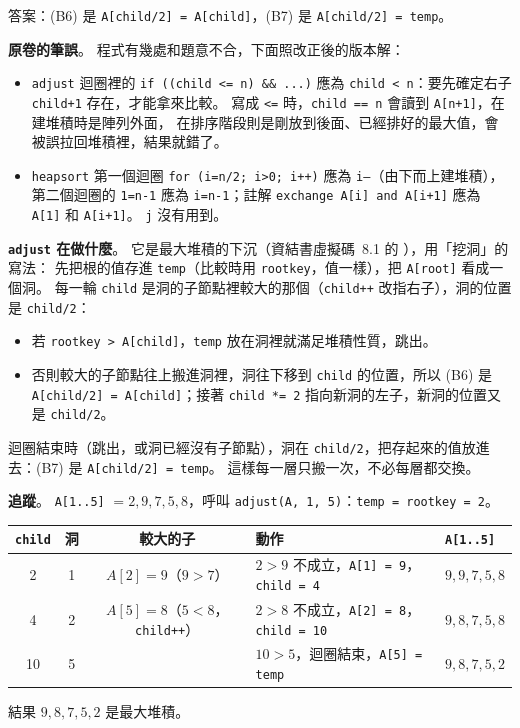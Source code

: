 \begin{pastsoln}
答案：(B6) 是 \texttt{A[child/2] = A[child]}，(B7) 是 \texttt{A[child/2] = temp}。

\textbf{原卷的筆誤}。 程式有幾處和題意不合，下面照改正後的版本解：
\begin{itemize}
\item \texttt{adjust} 迴圈裡的 \texttt{if ((child <= n) \&\& ...)} 應為 \texttt{child < n}：要先確定右子 \texttt{child+1}
存在，才能拿來比較。 寫成 \texttt{<=} 時，\texttt{child == n} 會讀到 \texttt{A[n+1]}，在建堆積時是陣列外面，
在排序階段則是剛放到後面、已經排好的最大值，會被誤拉回堆積裡，結果就錯了。
\item \texttt{heapsort} 第一個迴圈 \texttt{for (i=n/2; i>0; i++)} 應為 \texttt{i--}（由下而上建堆積），
第二個迴圈的 \texttt{1=n-1} 應為 \texttt{i=n-1}；註解 \texttt{exchange A[i] and A[i+1]} 應為 \texttt{A[1]} 和
\texttt{A[i+1]}。 \texttt{j} 沒有用到。
\end{itemize}

\textbf{\texttt{adjust} 在做什麼}。 它是最大堆積的下沉（資結書虛擬碼~8.1 的 ），用「挖洞」的寫法：
先把根的值存進 \texttt{temp}（比較時用 \texttt{rootkey}，值一樣），把 \texttt{A[root]} 看成一個洞。 每一輪
\texttt{child} 是洞的子節點裡較大的那個（\texttt{child++} 改指右子），洞的位置是 \texttt{child/2}：
\begin{itemize}
\item 若 \texttt{rootkey > A[child]}，\texttt{temp} 放在洞裡就滿足堆積性質，跳出。
\item 否則較大的子節點往上搬進洞裡，洞往下移到 \texttt{child} 的位置，所以 (B6) 是
\texttt{A[child/2] = A[child]}；接著 \texttt{child *= 2} 指向新洞的左子，新洞的位置又是 \texttt{child/2}。
\end{itemize}
迴圈結束時（跳出，或洞已經沒有子節點），洞在 \texttt{child/2}，把存起來的值放進去：(B7) 是
\texttt{A[child/2] = temp}。 這樣每一層只搬一次，不必每層都交換。

\textbf{追蹤}。 \texttt{A[1..5]} $= 2, 9, 7, 5, 8$，呼叫 \texttt{adjust(A, 1, 5)}：\texttt{temp = rootkey = 2}。
\begin{center}
\small
\begin{tabular}{cccll}
\toprule
\texttt{child} & 洞 & 較大的子 & 動作 & \texttt{A[1..5]} \\
\midrule
2 & 1 & $A[2] = 9$（$9 > 7$） & $2 > 9$ 不成立，\texttt{A[1] = 9}，\texttt{child = 4} & $9, 9, 7, 5, 8$ \\
4 & 2 & $A[5] = 8$（$5 < 8$，\texttt{child++}） & $2 > 8$ 不成立，\texttt{A[2] = 8}，\texttt{child = 10} & $9, 8, 7, 5, 8$ \\
10 & 5 & & $10 > 5$，迴圈結束，\texttt{A[5] = temp} & $9, 8, 7, 5, 2$ \\
\bottomrule
\end{tabular}
\end{center}
結果 $9, 8, 7, 5, 2$ 是最大堆積。


\end{pastsoln}
